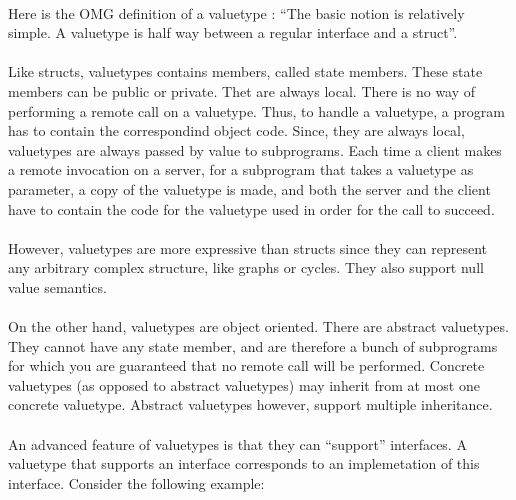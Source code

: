\paragraph{}Here is the OMG definition of a valuetype : ``The basic notion is
relatively simple. A valuetype is half way between a regular interface
and a struct''.

\paragraph{}Like structs, valuetypes contains members, called state
members. These state members can be public or private.
Thet are always local. There is no way of
performing a remote call on a valuetype. Thus, to handle a valuetype,
a program has to contain the correspondind object code. Since, they
are always local, valuetypes are always passed by value to
subprograms. Each time a client makes a remote invocation on a server,
for a subprogram that takes a valuetype as parameter, a copy of the
valuetype is made, and both the server and the client have to contain
the code for the valuetype used in order for the call to succeed.

\paragraph{} However, valuetypes are more expressive than structs
since they can represent any arbitrary complex structure, like graphs
or cycles. They also support null value semantics.

\paragraph{}On the other hand, valuetypes are object oriented. There
are abstract valuetypes. They cannot have any state member, and are
therefore a bunch of subprograms for which you are guaranteed that no
remote call will be performed. Concrete valuetypes
(as opposed to abstract valuetypes) may inherit from at most one
concrete valuetype. Abstract valuetypes however, support multiple inheritance.

\paragraph{}An advanced feature of valuetypes is that they can
``support'' interfaces. A valuetype that supports an interface
corresponds to an implemetation of this interface. Consider the following
example:

